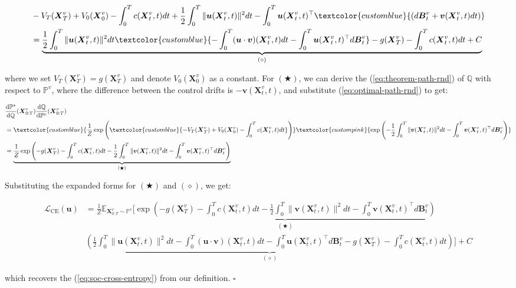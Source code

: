 \documentclass{article}
\newcommand{\bluetext}[1]{\textcolor{customblue}{#1}}
\newcommand{\pinktext}[1]{\textcolor{custompink}{#1}}
\begin{document}
\begin{small}
\begin{align}
    &-V_T(\boldsymbol{X}^v_T)+V_0(\boldsymbol{X}^v_0)-\int_0^Tc(\boldsymbol{X}^v_t,t)dt+\frac{1}{2}\int_0^T\|\boldsymbol{u}(\boldsymbol{X}^v_t,t)\|^2dt-\int_0^T\boldsymbol{u}(\boldsymbol{X}^v_t,t)^\top \bluetext{(d\boldsymbol{B}^v_t+\boldsymbol{v}(\boldsymbol{X}^v_t,t)dt)}\nonumber\\
    &=\underbrace{\frac{1}{2}\int_0^T\|\boldsymbol{u}(\boldsymbol{X}^v_t,t)\|^2dt\bluetext{-\int_0^T(\boldsymbol{u}\cdot \boldsymbol{v})(\boldsymbol{X}^v_t,t)dt-\int_0^T\boldsymbol{u}(\boldsymbol{X}^v_t,t)^\top d\boldsymbol{B}^v_t}-g(\boldsymbol{X}^v_T)-\int_0^Tc(\boldsymbol{X}^v_t,t)dt+C}_{(\diamond)}
\end{align}
\end{small}
where we set $V_T(\boldsymbol{X}^v_T)=g(\boldsymbol{X}^v_T)$ and denote $V_0(\boldsymbol{X}^v_0)$ as a constant. For $(\bigstar)$, we can derive the (\ref{eq:theorem-path-rnd}) of $\mathbb{Q}$ with respect to $\mathbb{P}^v$, where the difference between the control drifts is $-\boldsymbol{v}(\boldsymbol{X}^v_t,t)$, and substitute (\ref{eq:optimal-path-rnd}) to get:
\begin{small}
\begin{align}
    &\frac{\mathrm{d}\mathbb{P}^\star}{\mathrm{d}\mathbb{Q}}(\boldsymbol{X}^v_{0:T})\frac{\mathrm{d}\mathbb{Q}}{\mathrm{d}\mathbb{P}^v}(\boldsymbol{X}^v_{0:T})\nonumber\\
    &=\bluetext{\frac{1}{Z}\exp\left(\bluetext{-V_T(\boldsymbol{X}^v_T)+V_0(\boldsymbol{X}^v_0)-\int_0^Tc(\boldsymbol{X}^v_t,t)dt}\right)}\pinktext{\exp\left(-\frac{1}{2}\int_0^T\|\boldsymbol{v}(\boldsymbol{X}^v_t,t)\|^2dt-\int_0^T\boldsymbol{v}(\boldsymbol{X}^v_t,t)^\top d\boldsymbol{B}^v_t\right)}\nonumber\\
    &=\underbrace{\frac{1}{Z}\exp\left(-g(\boldsymbol{X}^v_T)-\int_0^Tc(\boldsymbol{X}^v_t,t)dt-\frac{1}{2}\int_0^T\|\boldsymbol{v}(\boldsymbol{X}^v_t,t)\|^2dt-\int_0^T\boldsymbol{v}(\boldsymbol{X}^v_t,t)^\top d\boldsymbol{B}^v_t\right)}_{(\bigstar)}\label{eq:ce-proof2}
\end{align}
\end{small}
Substituting the expanded forms for $(\bigstar)$ and $(\diamond)$, we get:
\begin{small}
\begin{align}
    \mathcal{L}_{\text{CE}}(\boldsymbol{u})&=\frac{1}{Z}\mathbb{E}_{\boldsymbol{X}_{0:T}^v\sim\mathbb{P}^v}\bigg[\underbrace{\exp\left(-g(\boldsymbol{X}^v_T)-\int_0^Tc(\boldsymbol{X}^v_t,t)dt-\frac{1}{2}\int_0^T\|\boldsymbol{v}(\boldsymbol{X}^v_t,t)\|^2dt-\int_0^T\boldsymbol{v}(\boldsymbol{X}^v_t,t)^\top d\boldsymbol{B}^v_t\right)}_{(\bigstar)}\nonumber\\
    &\underbrace{\left(\frac{1}{2}\int_0^T\|\boldsymbol{u}(\boldsymbol{X}^v_t,t)\|^2dt-\int_0^T(\boldsymbol{u}\cdot \boldsymbol{v})(\boldsymbol{X}^v_t,t)dt-\int_0^T\boldsymbol{u}(\boldsymbol{X}^v_t,t)^\top d\boldsymbol{B}^v_t-g(\boldsymbol{X}^v_T)-\int_0^Tc(\boldsymbol{X}^v_t,t)dt\right)}_{(\diamond)}\bigg]+C
\end{align}
\end{small}
which recovers the (\ref{eq:soc-cross-entropy}) from our definition. \hfill $\square$
\end{document}

